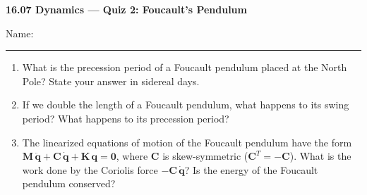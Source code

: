 \documentclass[11pt,letterpaper]{article}
\begin{document}
\begin{center}
    {\Large \textbf{16.07 Dynamics --- Quiz 2: Foucault's Pendulum}}
\end{center}

\vspace{4pt}

Name: \rule{3.2in}{0.4pt}

\vspace{14pt}
\begin{enumerate}[label=\textbf{\arabic*.}, leftmargin=*, itemsep=4pt, series=quiz]
\item What is the precession period of a Foucault pendulum placed at the North Pole? State your answer in sidereal days.



\vspace{2.0in}


\item If we double the length of a Foucault pendulum, what happens to its swing period? What happens to its precession period?
\vspace{2.0in}

\item The linearized equations of motion of the Foucault pendulum have the form $\mathbf{M}\,\ddot{\mathbf{q}} + \mathbf{C}\,\dot{\mathbf{q}} + \mathbf{K}\,\mathbf{q} = \mathbf{0}$,
where $\mathbf{C}$ is skew-symmetric ($\mathbf{C}^T = -\mathbf{C}$). What is the work done by the Coriolis force $-\mathbf{C}\,\dot{\mathbf{q}}$? Is the energy of the Foucault pendulum conserved?
\vspace*{\fill}

\end{enumerate}
\end{document}
